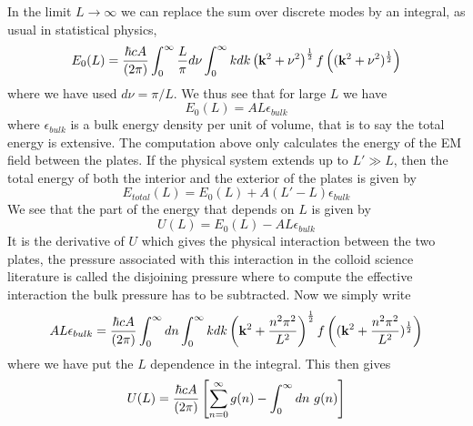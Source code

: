 In the limit $L\to\infty$ we can replace the sum over discrete modes by an integral, as usual in statistical physics, 
\begin{equation}
E_0(L) = {\hbar c A\over (2\pi)}\int_{0}^\infty {L\over \pi}d\nu \int_0^\infty kdk \left({\bf k}^2 + \nu^2\right)^{1\over 2}f\left(({\bf k}^2 + \nu^2)^{1\over 2}\right)
\end{equation}
where we have used $d\nu = \pi/L$. We thus see that for large $L$ we have
\begin{equation}
E_0(L) = AL \epsilon_{bulk}
\end{equation}
where $\epsilon_{bulk}$ is a bulk energy density per unit of volume, that is to say the total energy is extensive.  The computation above only calculates the energy of the EM field between the plates. If the physical system extends up to $L'\gg L$, then the total energy of both the interior and the exterior of the plates is
given by
\begin{equation}
E_{total}(L) = E_0(L) + A(L'-L)\epsilon_{bulk}
\end{equation}
We see that the part of the energy that depends on $L$ is given by
\begin{equation}
U(L) = E_0(L)- AL\epsilon_{bulk}
\end{equation}
It is the derivative of $U$ which gives the physical interaction between the two plates, the pressure associated with this interaction in the colloid science literature is called the disjoining pressure \cite{stubenrauch_disjoining_2003} where to compute the effective interaction the bulk pressure has to be subtracted.
Now we simply write 
\begin{equation}
AL\epsilon_{bulk} = {\hbar c A\over (2\pi)}\int_{0}^\infty dn \int_0^\infty kdk \left({\bf k}^2 + {n^2\pi^2\over L^2}\right)^{1\over 2} f\left(({\bf k}^2 + {n^2\pi^2\over L^2})^{1\over 2}\right)
\end{equation}
where we have put the $L$ dependence in the integral. This then gives
\begin{equation}
U(L) = {\hbar c A\over (2\pi)}\left[\sum_{n=0}^\infty g(n) -\int_0^\infty dn \ g(n)\right]
\end{equation}


